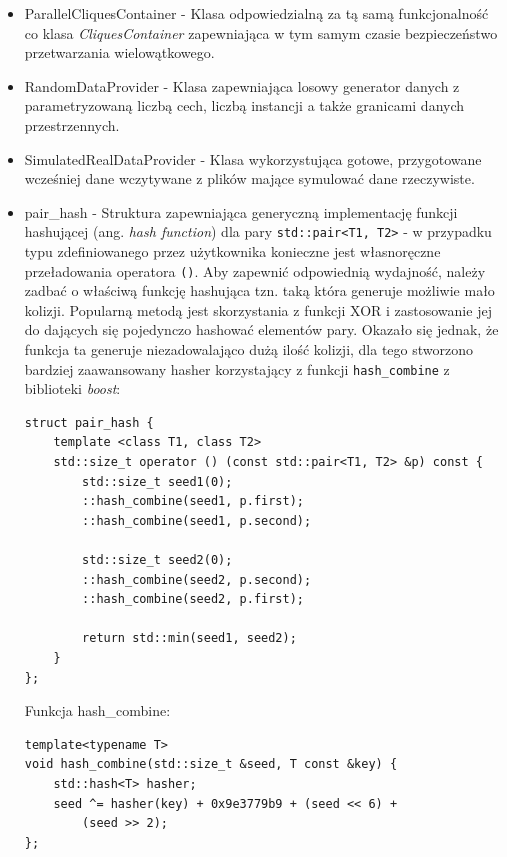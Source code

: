 \documentclass[12pt]{article}
\def\inline{\lstinline[basicstyle=\ttfamily,keywordstyle={}]}
\begin{document}
\begin{itemize}
\item ParallelCliquesContainer - Klasa odpowiedzialną za tą samą funkcjonalność co klasa \textit{CliquesContainer} zapewniająca w tym samym czasie bezpieczeństwo przetwarzania wielowątkowego.

\item RandomDataProvider - Klasa zapewniająca losowy generator danych z parametryzowaną liczbą cech, liczbą instancji a także granicami danych przestrzennych.

\item SimulatedRealDataProvider - Klasa wykorzystująca gotowe, przygotowane wcześniej dane wczytywane z plików mające symulować dane rzeczywiste.

\item pair\_hash - Struktura zapewniająca generyczną implementację funkcji hashującej (ang.
\textit{hash function}) dla pary \inline{std::pair<T1, T2>} - w przypadku typu zdefiniowanego przez użytkownika konieczne jest własnoręczne przeładowania operatora \inline{()}. Aby zapewnić odpowiednią wydajność, należy zadbać o właściwą funkcję hashująca tzn. taką która generuje możliwie mało kolizji. Popularną metodą jest skorzystania z funkcji XOR i zastosowanie jej do dających się pojedynczo hashować elementów pary. Okazało się jednak, że funkcja ta generuje niezadowalająco dużą ilość kolizji, dla tego stworzono bardziej zaawansowany hasher korzystający z funkcji \inline{hash_combine} z biblioteki \textit{boost}:
\begin{minipage}{\linewidth}
\begin{lstlisting}[caption={Kod struktury pair\_hash}]
struct pair_hash {
	template <class T1, class T2>
	std::size_t operator () (const std::pair<T1, T2> &p) const {
		std::size_t seed1(0);
		::hash_combine(seed1, p.first);
		::hash_combine(seed1, p.second);

		std::size_t seed2(0);
		::hash_combine(seed2, p.second);
		::hash_combine(seed2, p.first);

		return std::min(seed1, seed2);
	}
};
\end{lstlisting}
\end{minipage}

Funkcja hash\_combine:
\begin{minipage}{\linewidth}
\begin{lstlisting}[caption={Kod funkcji hash\_combine}]
template<typename T>
void hash_combine(std::size_t &seed, T const &key) {
	std::hash<T> hasher;
	seed ^= hasher(key) + 0x9e3779b9 + (seed << 6) +
    	(seed >> 2);
};
\end{lstlisting}
\end{minipage}


\end{itemize}
\end{document}
